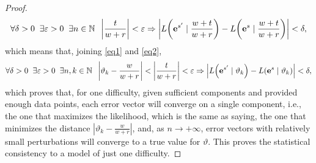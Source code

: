 \documentclass{article}
\newcommand{\0}{\mathbbold{0}}
\newcommand{\1}{\mathds{1}}
\newcommand{\Lh}[2]{L\!\left(#1 \mid #2\right)}
\begin{document}
\begin{proof}
    \begin{equation}
        \forall \delta > 0 \;\; \exists \varepsilon > 0 \;\; \exists n \in \mathbb{N} \;\; \left| \frac{t}{w+r} \right| < \varepsilon \Rightarrow \left| \Lh{{\bf e}^{s'}}{\frac{w+t}{w+r}} - \Lh{{\bf e}^{s}}{\frac{w+t}{w+r}} \right| < \delta, \label{eq2}
    \end{equation}
    which means that, joining \eqref{eq1} and \eqref{eq2},
    \begin{equation}
        \forall \delta > 0 \;\; \exists \varepsilon > 0 \;\; \exists n,k \in \mathbb{N} \;\; \left| \vartheta_k - \frac{w}{w+r} \right| < \left| \frac{t}{w+r} \right| < \varepsilon \Rightarrow \left| \Lh{{\bf e}^{s'}}{\vartheta_k} - \Lh{{\bf e}^{s}}{\vartheta_k} \right| < \delta, \label{eq3}
    \end{equation}
    which proves that, for one difficulty, given sufficient components and provided enough data points, each error vector will converge on a single component, i.e., the one that maximizes the likelihood, which is the same as saying, the one that minimizes the distance $ \left| \vartheta_k - \frac{w}{w+r} \right| $, and, as $n \rightarrow +\infty$, error vectors with relatively small perturbations will converge to a true value for $\vartheta$.
    This proves the statistical consistency to a model of just one difficulty.
    

\end{proof}
\end{document}

